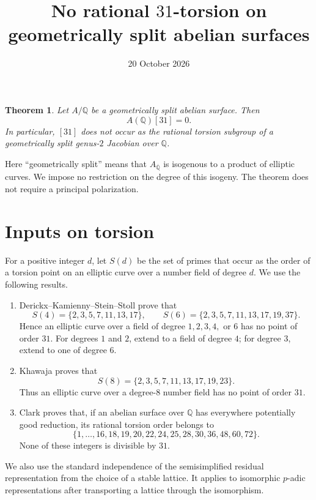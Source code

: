 \documentclass[11pt]{article}
\title{No rational \(31\)-torsion on geometrically split abelian surfaces}
\author{}
\date{20 October 2026}
\newtheorem{theorem}{Theorem}
\newcommand{\Q}{\mathbb Q}
\begin{document}
\maketitle

\begin{theorem}\label{thm:main}
Let \(A/\Q\) be a geometrically split abelian surface. Then
\[
 A(\Q)[31]=0.
\]
In particular, \([31]\) does not occur as the rational torsion subgroup
of a geometrically split genus-\(2\) Jacobian over \(\Q\).
\end{theorem}

Here ``geometrically split'' means that \(A_{\overline{\Q}}\) is
isogenous to a product of elliptic curves. We impose no restriction on
the degree of this isogeny. The theorem does not require a principal
polarization.

\section{Inputs on torsion}

For a positive integer \(d\), let \(S(d)\) be the set of primes that
occur as the order of a torsion point on an elliptic curve over a
number field of degree \(d\). We use the following results.
\begin{enumerate}
\item Derickx--Kamienny--Stein--Stoll \cite[Theorem 1.2]{DKSS} prove that
\[
 S(4)=\{2,3,5,7,11,13,17\},\qquad
 S(6)=\{2,3,5,7,11,13,17,19,37\}.
\]
Hence an elliptic curve over a field of degree \(1,2,3,4,\) or \(6\)
has no point of order \(31\). For degrees \(1\) and \(2\), extend
to a field of degree \(4\); for degree \(3\), extend to one of degree
\(6\).
\item Khawaja \cite[Theorem 1.2]{Khawaja} proves that
\[
 S(8)=\{2,3,5,7,11,13,17,19,23\}.
\]
Thus an elliptic curve over a degree-\(8\) number field has no point
of order \(31\).
\item Clark \cite[Theorem 5]{Clark} proves that, if an abelian surface
over \(\Q\) has everywhere potentially good reduction, its rational
torsion order belongs to
\[
 \{1,\ldots,16,18,19,20,22,24,25,28,30,36,48,60,72\}.
\]
None of these integers is divisible by \(31\).
\end{enumerate}

We also use the standard independence of the semisimplified residual
representation from the choice of a stable lattice. It applies to
isomorphic \(p\)-adic representations after transporting a lattice
through the isomorphism.
\end{document}
